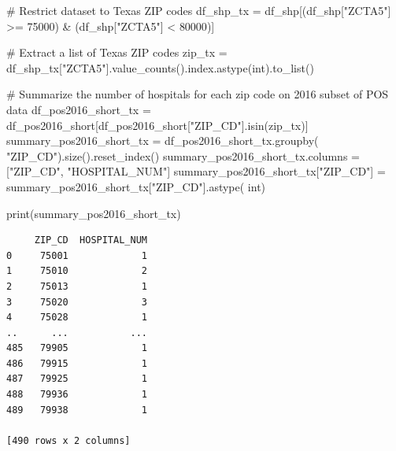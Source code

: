 \documentclass[
  letterpaper,
  DIV=11,
  numbers=noendperiod]{scrartcl}
\newenvironment{Shaded}{\begin{snugshade}}{\end{snugshade}}
\newcommand{\BuiltInTok}[1]{\textcolor[rgb]{0.00,0.23,0.31}{#1}}
\newcommand{\CommentTok}[1]{\textcolor[rgb]{0.37,0.37,0.37}{#1}}
\newcommand{\DecValTok}[1]{\textcolor[rgb]{0.68,0.00,0.00}{#1}}
\newcommand{\NormalTok}[1]{\textcolor[rgb]{0.00,0.23,0.31}{#1}}
\newcommand{\OperatorTok}[1]{\textcolor[rgb]{0.37,0.37,0.37}{#1}}
\newcommand{\StringTok}[1]{\textcolor[rgb]{0.13,0.47,0.30}{#1}}
\begin{document}
\begin{Shaded}
\begin{Highlighting}[]
\CommentTok{\# Restrict dataset to Texas ZIP codes}
\NormalTok{df\_shp\_tx }\OperatorTok{=}\NormalTok{ df\_shp[(df\_shp[}\StringTok{"ZCTA5"}\NormalTok{] }\OperatorTok{\textgreater{}=} \DecValTok{75000}\NormalTok{) }\OperatorTok{\&}\NormalTok{ (df\_shp[}\StringTok{"ZCTA5"}\NormalTok{] }\OperatorTok{\textless{}} \DecValTok{80000}\NormalTok{)]}

\CommentTok{\# Extract a list of Texas ZIP codes}
\NormalTok{zip\_tx }\OperatorTok{=}\NormalTok{ df\_shp\_tx[}\StringTok{"ZCTA5"}\NormalTok{].value\_counts().index.astype(}\BuiltInTok{int}\NormalTok{).to\_list()}

\CommentTok{\# Summarize the number of hospitals for each zip code on 2016 subset of POS data}
\NormalTok{df\_pos2016\_short\_tx }\OperatorTok{=}\NormalTok{ df\_pos2016\_short[df\_pos2016\_short[}\StringTok{"ZIP\_CD"}\NormalTok{].isin(zip\_tx)]}
\NormalTok{summary\_pos2016\_short\_tx }\OperatorTok{=}\NormalTok{ df\_pos2016\_short\_tx.groupby(}
    \StringTok{"ZIP\_CD"}\NormalTok{).size().reset\_index()}
\NormalTok{summary\_pos2016\_short\_tx.columns }\OperatorTok{=}\NormalTok{ [}\StringTok{"ZIP\_CD"}\NormalTok{, }\StringTok{"HOSPITAL\_NUM"}\NormalTok{]}
\NormalTok{summary\_pos2016\_short\_tx[}\StringTok{"ZIP\_CD"}\NormalTok{] }\OperatorTok{=}\NormalTok{ summary\_pos2016\_short\_tx[}\StringTok{"ZIP\_CD"}\NormalTok{].astype(}
    \BuiltInTok{int}\NormalTok{)}

\BuiltInTok{print}\NormalTok{(summary\_pos2016\_short\_tx)}
\end{Highlighting}
\end{Shaded}

\begin{verbatim}
     ZIP_CD  HOSPITAL_NUM
0     75001             1
1     75010             2
2     75013             1
3     75020             3
4     75028             1
..      ...           ...
485   79905             1
486   79915             1
487   79925             1
488   79936             1
489   79938             1

[490 rows x 2 columns]
\end{verbatim}
\end{document}
